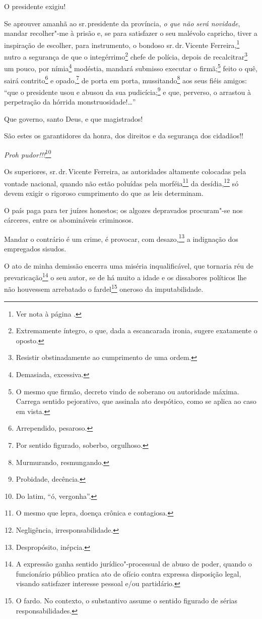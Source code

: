 O presidente exigiu!

Se aprouver amanhã ao sr.\,presidente da província, \emph{o que não será
novidade}, mandar recolher"-me à prisão e, se para satisfazer o seu
malévolo capricho, tiver a inspiração de escolher, para instrumento, o
bondoso sr.\,dr.\,Vicente Ferreira,\footnote{Ver nota à página \pageref{bueno}.} nutro a segurança de que o
integérrimo\footnote{Extremamente íntegro, o que, dada a escancarada
  ironia, sugere exatamente o oposto.} chefe de polícia, depois de
recalcitrar\footnote{Resistir obstinadamente ao cumprimento de uma
  ordem.} um pouco, por nímia\footnote{Demasiada, excessiva.}
modéstia, mandará submisso executar o firmã;\footnote{O mesmo que
  firmão, decreto vindo de soberano ou autoridade máxima. Carrega
  sentido pejorativo, que assinala ato despótico, como se aplica ao caso
  em vista.} feito o quê, sairá contrito\footnote{Arrependido,
  pesaroso.} e opado,\footnote{Por sentido figurado, soberbo,
  orgulhoso.} de porta em porta, mussitando\footnote{Murmurando,
  resmungando.} aos seus fiéis amigos: ``que o presidente usou e abusou
da sua pudicícia;\footnote{Probidade, decência.} e que, perverso, o
arrastou à perpetração da hórrida monstruosidade!\ldots{}''

Que governo, santo Deus, e que magistrados!

São estes os garantidores da honra, dos direitos e da segurança dos
cidadãos!!

\emph{Proh pudor!!!}\footnote{Do latim, ``ó, vergonha''.}

Os superiores, sr.\,dr.\,Vicente Ferreira, as autoridades altamente
colocadas pela vontade nacional, quando não estão poluídas pela
morféia\footnote{O mesmo que lepra, doença crônica e contagiosa.} da
desídia,\footnote{Negligência, irresponsabilidade.} só devem exigir o
rigoroso cumprimento do que as leis determinam.

O país paga para ter juízes honestos; os algozes depravados procuram"-se
nos cárceres, entre os abomináveis criminosos.

Mandar o contrário é um crime, é provocar, com desazo,\footnote{
  Despropósito, inépcia.} a indignação dos empregados sisudos.

O ato de minha demissão encerra uma miséria inqualificável, que tornaria
réu de prevaricação\footnote{A expressão ganha sentido
  jurídico"-processual de abuso de poder, quando o funcionário público
  pratica ato de ofício contra expressa disposição legal, visando
  satisfazer interesse pessoal e/ou partidário.} o seu autor, se de há
muito a idade e os dissabores políticos lhe não houvessem arrebatado o
fardel\footnote{O fardo. No contexto, o substantivo assume o
  sentido figurado de sérias responsabilidades.} oneroso da
imputabilidade.

